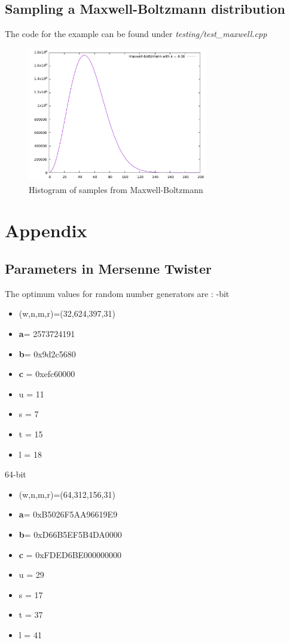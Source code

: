 \documentclass[titlepage, 11pt]{article}
\begin{document}
\subsection{Sampling a Maxwell-Boltzmann distribution}
The code for the example can be found under \textit{testing/test\_maxwell.cpp}
\begin{figure}[!ht]
    \centering
    \includegraphics[width=0.7\textwidth]{images/maxwell_pdf.pdf}
    \caption{Histogram of samples from Maxwell-Boltzmann}
    \label{fig:example-sampling-maxwell}
\end{figure}
\newpage
\pagebreak
\section{Appendix}
\subsection{Parameters in Mersenne Twister}
The optimum values for random number generators are :
-bit
\begin{itemize}
\item (w,n,m,r)=(32,624,397,31)
\item \textbf{a}= 2573724191
\item \textbf{b}= 0x9d2c5680
\item \textbf{c} = 0xefc60000
\item u  =  11
\item s  =  7
\item t =  15
\item l  = 18
\end{itemize}
64-bit
\begin{itemize}
\item (w,n,m,r)=(64,312,156,31)
\item \textbf{a}= 0xB5026F5AA96619E9
\item \textbf{b}= 0xD66B5EF5B4DA0000
\item \textbf{c} = 0xFDED6BE000000000
\item u  =  29
\item s  =  17
\item t =  37
\item l  = 41
\end{itemize}
\end{document}
